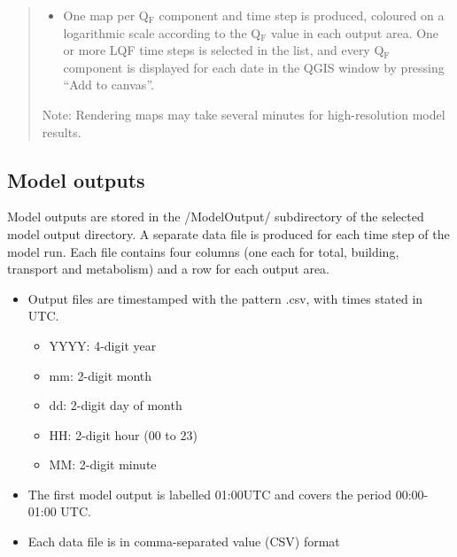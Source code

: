 \documentclass[letterpaper,10pt,english]{sphinxmanual}
\begin{document}
\begin{quote}
\begin{itemize}
\end{itemize}

\begin{itemize}
\item {} 
One map per Q$_{\text{F}}$ component and time step is produced, coloured on a logarithmic scale according to the Q$_{\text{F}}$ value in each output area. One or more LQF time steps is selected in the list, and every Q$_{\text{F}}$ component is displayed for each date in the QGIS window by pressing “Add to canvas”.

\end{itemize}

Note: Rendering maps may take several minutes for high-resolution model results.
\end{quote}


\subsection{Model outputs}
\label{\detokenize{OtherManuals/LQF_Manual:model-outputs}}
Model outputs are stored in the /ModelOutput/ subdirectory of the
selected model output directory. A separate data file is produced for
each time step of the model run. Each file contains four columns (one
each for total, building, transport and metabolism) and a row for each
output area.
\begin{itemize}
\item {} 
Output files are timestamped with the pattern
.csv, with times stated in UTC.
\begin{itemize}
\item {} 
YYYY: 4-digit year

\item {} 
mm: 2-digit month

\item {} 
dd: 2-digit day of month

\item {} 
HH: 2-digit hour (00 to 23)

\item {} 
MM: 2-digit minute

\end{itemize}

\item {} 
The first model output is labelled 01:00UTC and covers the period
00:00-01:00 UTC.

\item {} 
Each data file is in comma-separated value (CSV) format

\end{itemize}
\end{document}

